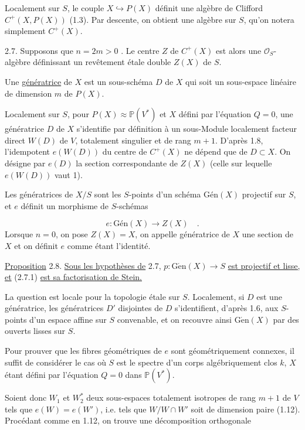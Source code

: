 Localement sur $S$, le couple $X \hookrightarrow P(X)$ définit une algèbre de Clifford $C^+(X, P(X))$ (1.3). Par descente, on obtient une algèbre sur $S$, qu'on notera simplement $C^+(X)$.

2.7. Supposons que $n = 2m > 0$ . Le centre $Z$ de $C^+(X)$ est alors une $\mathcal{O}_S$-algèbre définissant un revêtement étale double $Z(X)$ de $S$.

Une \underline{génératrice} de $X$ est un sous-schéma $D$ de $X$ qui soit un sous-espace linéaire de dimension $m$ de $P(X)$.

Localement sur $S$, pour $P(X) \approx \mathbb{P}(V^*)$ et $X$ défini par l'équation $Q = 0$, une génératrice $D$ de $X$ s'identifie par définition à un sous-Module localement facteur direct $W(D)$ de $V$, totalement singulier et de rang $m + 1$. D'après 1.8, l'idempotent $e(W(D))$ du centre de $C^+(X)$ ne dépend que de $D \subset X$. On désigne par $e(D)$ la section correspondante de $Z(X)$ (celle sur lequelle $e(W(D))$ vaut 1).

Les génératrices de $X/S$ sont les $S$-points d'un schéma $\mbox{Gén}(X)$ projectif sur $S$, et $e$ définit un morphisme de $S$-schémas

\begin{equation}\tag{2.7.1}
e : \mbox{Gén}(X) \longrightarrow Z(X) \quad .
\end{equation}
Lorsque $n = 0$, on pose $Z(X) = X$, on appelle génératrice de $X$ une section de $X$ et on définit $e$ comme étant l'identité.



\underline{Proposition} 2.8. \underline{Sous les hypothèses de} 2.7, $p : \mathrm{G\acute{e}n}(X) \longrightarrow S$ \underline{est projectif et lisse, et} (2.7.1) \underline{est sa factorisation de Stein.}

La question est locale pour la topologie étale sur $S$. Localement, si $D$ est une génératrice, les génératrices $D'$ disjointes de $D$ s'identifient, d'après 1.6, aux $S$-points d'un espace affine sur $S$ convenable, et on recouvre ainsi $\mathrm{G\acute{e}n}(X)$ par des ouverts lisses sur $S$.

Pour prouver que les fibres géométriques de $e$ sont géométriquement connexes, il suffit de considérer le cas où $S$ est le spectre d'un corps algébriquement clos $k$, $X$ étant défini par l'équation $Q = 0$ dans $\mathbb{P}(V^*)$.

Soient donc $W_1$ et $W^*_2$ deux sous-espaces totalement isotropes de rang $m + 1$ de $V$ tels que $e(W) = e(W')$, i.e. tels que $W/W \cap W'$ soit de dimension paire (1.12). Procédant comme en 1.12, on trouve une décomposition orthogonale

